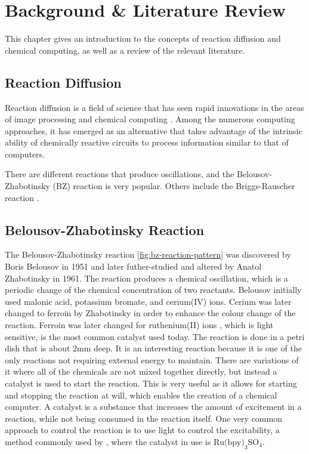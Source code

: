 \chapter{Background \& Literature Review}
This chapter gives an introduction to the concepts of reaction diffusion and chemical computing,  as well as a review of the relevant literature.

\section{Reaction Diffusion}

Reaction diffusion is a field of science that has seen rapid innovations in the areas of image processing \citep{kuhnert1989image} and chemical computing \citep{dittrich2004chemical}. Among the numerous computing approaches, it has emerged as an alternative that takes advantage of the intrinsic ability of chemically reactive circuits to process information similar to that of computers. 

There are different reactions that produce oscillations, and the Belousov-Zhabotinsky (BZ) reaction is very popular. Others include the Briggs-Rauscher reaction \citep{de1982mechanistic}.
\section{Belousov-Zhabotinsky Reaction}
The Belousov-Zhabotinsky reaction \ref{fig:bz-reaction-pattern} was discovered by Boris Belousov in 1951 and later futher-studied and altered by Anatol Zhabotinsky in 1961. The reaction produces a chemical oscillation, which is a periodic change of the chemical concentration of two reactants. 
Belousov initially used malonic acid, potassium bromate, and cerium(IV) ions. Cerium was later changed to ferroin by Zhabotinsky in order to enhance the colour change of the reaction.
Ferroin was later changed for ruthenium(II) ions \citep{toth2006tris}, which is light sensitive, is the most common catalyst used today. The reaction is done in a petri dish that is about 2mm deep. 
It is an interesting reaction because it is one of the only reactions not requiring external energy to maintain. 
There are variations of it where all of the chemicals are not mixed together directly, but instead a catalyst is used to start the reaction.
This is very useful as it allows for starting and stopping the reaction at will, which enables the creation of a chemical computer.
A catalyst is a substance that increases the amount of excitement in a reaction, while not being consumed in the reaction itself.
One very common approach to control the reaction is to use light to control the excitability, a method commonly used by \cite{gorecki2003chemical}, where the catalyst in use is $\text{Ru(bpy)}_3\text{SO}_4$.

